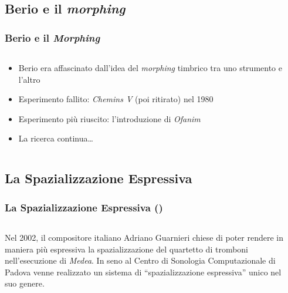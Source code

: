 \documentclass[compress]{beamer}
\begin{document}
\subsection[Morphing]{Berio e il {\it morphing}}

\begin{frame}
    \frametitle<+- | alert@+->{Berio e il \emph{Morphing}}

    \begin{columns}[T]
        \begin{column}{0.7\textwidth}
            \begin{itemize}[<+- | alert@+->]
                \item Berio era affascinato dall'idea del \emph{morphing}
                    timbrico tra uno strumento e l'altro
                \item Esperimento fallito: \emph{Chemins V} (poi ritirato) nel 1980
                \item Esperimento pi\`u riuscito: l'introduzione di \emph{Ofanim}
                \item La ricerca continua\dots
            \end{itemize}
        \end{column}
        \begin{column}{0.3\textwidth}
        \end{column}
    \end{columns}

\end{frame}

\subsection[Spazializzazione]{La Spazializzazione Espressiva}

\setcounter{ms}{0}

\begin{frame}
    \frametitle<+- | alert@+->{La Spazializzazione Espressiva ()}

    \begin{columns}[T]
        \begin{column}{0.7\textwidth}
            Nel 2002, il compositore italiano Adriano Guarnieri chiese di
            poter rendere in maniera pi\`u espressiva la spazializzazione del
            quartetto di tromboni nell'esecuzione di \emph{Medea}.
            In seno al Centro di Sonologia Computazionale di Padova venne
            realizzato un sistema di ``spazializzazione espressiva'' unico nel
            suo genere.
        \end{column}
        \begin{column}{0.3\textwidth}
        \end{column}
    \end{columns}
    
\end{frame}
\end{document}
